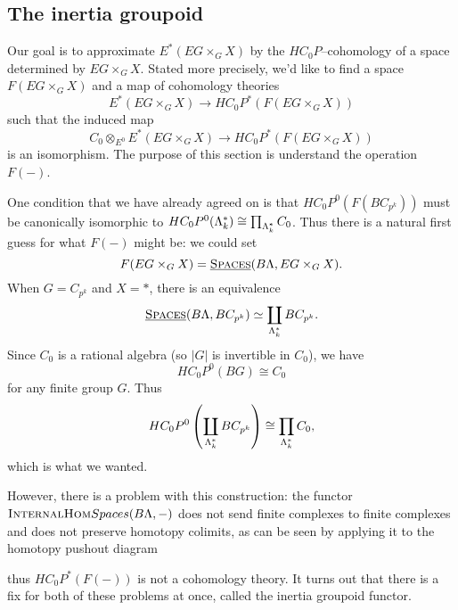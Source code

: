 \subsection*{The inertia groupoid}

Our goal is to approximate $E^*(EG \times_G X)$ by the $HC_0P$--cohomology of a space determined by $EG \times_G X$. Stated more precisely, we'd like to find a space $F(EG \times_G X)$ and a map of cohomology theories
\[
E^*(EG \times_G X) \to HC_0P^*(F(EG \times_G X))
\]
such that the induced map
\[
C_0 \otimes_{E^0} E^*(EG \times_G X) \to HC_0P^*(F(EG \times_G X))
\]
is an isomorphism. The purpose of this section is understand the operation $F(-)$. 

One condition that we have already agreed on is that $HC_0P^0(F(BC_{p^k}))$ must be canonically isomorphic to $HC_0P^0(\Lambda_k^*) \cong \prod_{\Lambda_k^*}C_0$. Thus there is a natural first guess for what $F(-)$ might be: we could set 
\[
F(EG \times_G X) = \operatorname{\underline{\smash{\normalfont\textsc{Spaces}}}}(B\Lambda, EG \times_G X).
\]
When $G = C_{p^k}$ and $X = *$, there is an equivalence
\[
\operatorname{\underline{\smash{\normalfont\textsc{Spaces}}}}(B\Lambda, BC_{p^k}) \simeq \coprod_{\Lambda_k^*} BC_{p^k}.
\]
Since $C_0$ is a rational algebra (so $|G|$ is invertible in $C_0$), we have 
\[
HC_0P^0(BG) \cong C_0
\]
for any finite group $G$. Thus
\[
HC_0P^0\left(\coprod_{\Lambda_k^*} BC_{p^k}\right) \cong \prod_{\Lambda_k^*}C_0,
\]
which is what we wanted.

However, there is a problem with this construction: the functor $\normalfont\textsc{InternalHom}{Spaces}(B\Lambda,-)$ does not send finite complexes to finite complexes and does not preserve homotopy colimits, as can be seen by applying it to the homotopy pushout diagram
\begin{center}
\end{center}
thus $HC_0P^*(F(-))$ is not a cohomology theory. It turns out that there is a fix for both of these problems at once, called the inertia groupoid functor. 

%

